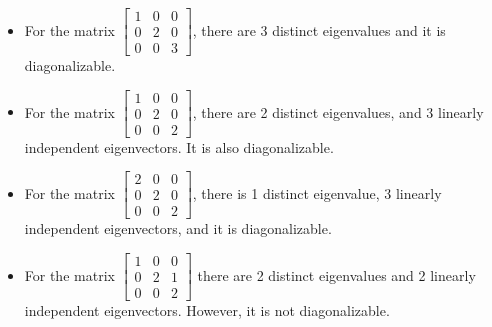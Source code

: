 \documentclass[11pt]{article}
\begin{document}
    \begin{itemize}
        \item For the matrix \(\begin{bmatrix}
                                1 & 0 & 0 \\
                                0 & 2 & 0 \\
                                0 & 0 & 3
                            \end{bmatrix}\), there are 3 distinct eigenvalues and it is diagonalizable.
        \item For the matrix \(\begin{bmatrix}
                                1 & 0 & 0 \\
                                0 & 2 & 0 \\
                                0 & 0 & 2
                            \end{bmatrix}\), there are 2 distinct eigenvalues, and 3 linearly independent eigenvectors. It is also diagonalizable.
        \item For the matrix \(\begin{bmatrix}
                                2 & 0 & 0 \\
                                0 & 2 & 0 \\
                                0 & 0 & 2
                            \end{bmatrix}\), there is 1 distinct eigenvalue, 3 linearly independent eigenvectors, and it is diagonalizable.
        \item For the matrix \(\begin{bmatrix}
                                1 & 0 & 0 \\
                                0 & 2 & 1 \\
                                0 & 0 & 2
                            \end{bmatrix}\) there are 2 distinct eigenvalues and 2 linearly independent eigenvectors. However, it is not diagonalizable.
    \end{itemize}
\end{document}

